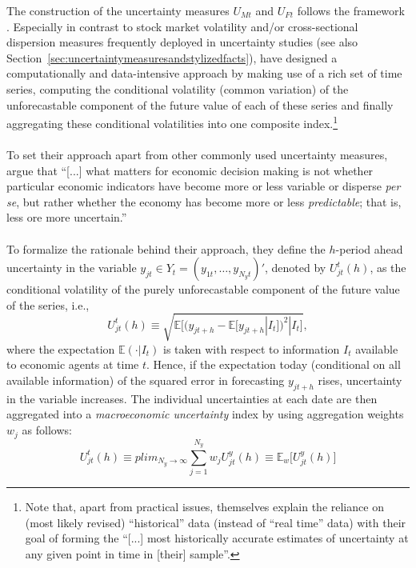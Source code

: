 \documentclass[a4paper,11pt,listof=nochaptergap,oneside,pointednumbers,bibtotoc,bigheadings,liststotoc]{scrbook}
\theoremstyle{mysatz}
\theoremstyle{mydefinition}
\theoremstyle{mytheorem}
\theoremstyle{mybemerkung}
\begin{document}
The construction of the uncertainty measures $U_{Mt}$ and $U_{Ft}$ follows the framework \citet{juradoetal:15}. Especially in contrast to stock market volatility and/or cross-sectional dispersion measures frequently deployed in uncertainty studies (see also Section~\ref{sec:uncertaintymeasuresandstylizedfacts}), \citet{juradoetal:15} have designed a computationally and data-intensive approach by making use of a rich set of time series, computing the conditional volatility (common variation) of the unforecastable component of the future value of each of these series and finally aggregating these conditional volatilities into one composite index.\footnote{Note that, apart from practical issues, \citet[p. 1191]{juradoetal:15} themselves explain the reliance on (most likely revised) ``historical'' data (instead of ``real time'' data) with their goal of forming the ``[...] most historically accurate estimates of uncertainty at any given point in time in [their] sample''.}\\
\\
To set their approach apart from other commonly used uncertainty measures, \citet[p. 1178]{juradoetal:15} argue that ``[...] what matters for economic decision making is not whether particular economic indicators have become more or less variable or disperse \textit{per se}, but rather whether the economy has become more or less \textit{predictable}; that is, less ore more uncertain.''\\
\\
To formalize the rationale behind their approach, they define the $h$-period ahead uncertainty in the variable $y_{jt} \in Y_t = (y_{1t}, \ldots, y_{N_{y}t})'$, denoted by $U^t_{jt}(h)$, as the conditional volatility of the purely unforecastable component of the future value of the series, i.e.,
\begin{equation} \label{eq:juradoetal_1}
U^t_{jt}(h) \equiv \sqrt{\mathbb{E}\Big[(y_{jt+h} - \mathbb{E}[y_{jt+h}|I_t])^2|I_t\Big]},
\end{equation}
where the expectation $\mathbb{E}(\cdot|I_t)$ is taken with respect to information $I_t$ available to economic agents at time $t$. Hence, if the expectation today (conditional on all available information) of the squared error in forecasting $y_{jt+h}$ rises, uncertainty in the variable increases. The individual uncertainties at each date are then aggregated into a \textit{macroeconomic uncertainty} index by using aggregation weights $w_j$ as follows:
\begin{equation} \label{eq:juradoetal_2}
U^t_{jt}(h) \equiv plim_{N_{y}\to\infty} \sum_{j=1}^{N_y} w_j U_{jt}^y(h) \equiv \mathbb{E}_w \Big[U_{jt}^y(h)\Big]
\end{equation}
\end{document}
